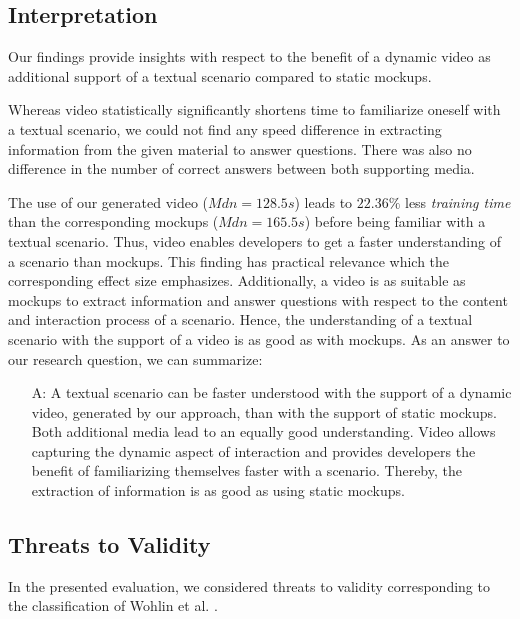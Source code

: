\documentclass[conference]{IEEEtran}
\begin{document}
\subsection{Interpretation}
Our findings provide insights with respect to the benefit of a dynamic video as 
additional support of a textual scenario compared to static mockups.

Whereas video statistically significantly shortens time to familiarize oneself 
with a textual scenario, we could not find any speed difference in extracting 
information from the given material to answer questions. There was also no 
difference in the number of correct answers between both supporting media.

The use of our generated video ($Mdn = 128.5 s$) leads to $22.36 \%$ less 
\textit{training time} than the corresponding mockups ($Mdn = 165.5 s$) before 
being familiar with a textual scenario. Thus, video enables developers to 
get a faster understanding of a scenario than mockups. This finding has 
practical relevance which the corresponding effect size emphasizes. 
Additionally, a video is as suitable as mockups to extract information and 
answer questions with respect to the content and interaction process of a 
scenario. Hence, the understanding of a textual scenario with the support of a 
video is as good as with mockups. As an answer to our research question, we can 
summarize:

\begin{itemize}[\settowidth{\labelwidth}{A:}]
	\item[A:] A textual scenario can be faster understood with the support of a 
	dynamic video, generated by our approach, than with the support of static 
	mockups. Both additional media lead to an equally good understanding. Video 
	allows capturing the dynamic aspect of interaction and provides developers 
	the benefit of 	familiarizing themselves faster with a scenario. Thereby, 
	the extraction of information is as good as using static mockups.
\end{itemize}

\subsection{Threats to Validity}
In the presented evaluation, we considered threats to validity corresponding to 
the classification of Wohlin et al. \cite{Wohlin.2012}.
\end{document}
